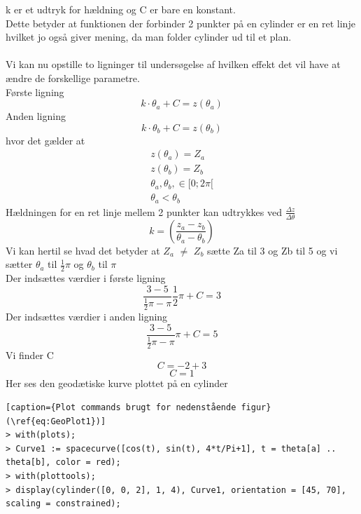 k er et udtryk for hældning og C er bare en konstant.
\\
Dette betyder at funktionen der forbinder 2 punkter på en cylinder er en ret linje hvilket jo også giver mening, da man folder cylinder ud til et plan.
\\
\\
Vi kan nu opstille to ligninger til undersøgelse af hvilken effekt det vil have at ændre de forskellige parametre.
\\
Første ligning
\begin{equation}
k\cdot \theta_a + C = z(\theta_a)
\end{equation}
Anden ligning
\begin{equation}
k\cdot \theta_b + C = z(\theta_b)
\end{equation}
hvor det gælder at
\begin{equation}
\begin{gathered}
z(\theta_a)=Z_a \\
z(\theta_b)=Z_b\\
\theta_a,\theta_b,\in[0;2\pi[ \\
\theta_a < \theta_b
\end{gathered}
\end{equation}
Hældningen for en ret linje mellem 2 punkter kan udtrykkes ved $\frac{\Delta z}{\Delta \theta}$
\begin{equation}
k=(\frac{z_a-z_b}{\theta_a-\theta_b})
\end{equation}
Vi kan hertil se hvad det betyder at $Z_a$ $\neq$
$Z_b$ sætte Za til 3 og Zb til 5 og vi sætter $\theta_a$ til $\frac{1}{2} \pi$ og $\theta_b$ til $\pi$
\\
Der indsættes værdier i første ligning
\begin{equation}
\frac{3-5}{\frac{1}{2}\pi-\pi}\frac{1}{2} \pi + C = 3
\end{equation}
Der indsættes værdier i anden ligning
\begin{equation}
\frac{3-5}{\frac{1}{2}\pi-\pi}\pi + C = 5
\end{equation}
Vi finder C
\begin{equation}
C = -2+3
\end{equation}
\begin{equation}
C = 1
\end{equation}
Her ses den geodætiske kurve plottet på en cylinder
\begin{lstlisting}[caption={Plot commands brugt for nedenstående figur}(\ref{eq:GeoPlot1})] 
> with(plots);
> Curve1 := spacecurve([cos(t), sin(t), 4*t/Pi+1], t = theta[a] .. theta[b], color = red);
> with(plottools);
> display(cylinder([0, 0, 2], 1, 4), Curve1, orientation = [45, 70], scaling = constrained);

\end{lstlisting}

